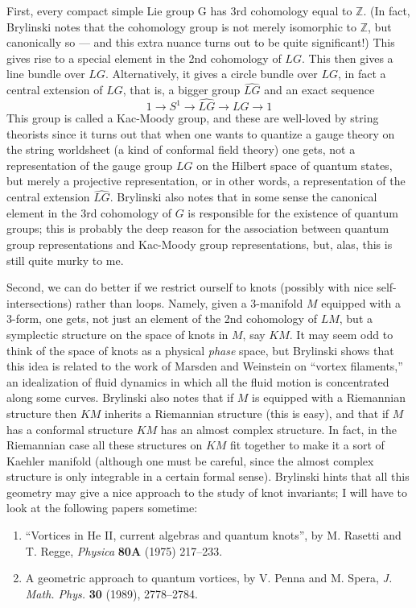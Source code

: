 \documentclass{article}
\begin{document}
First, every compact simple Lie group G has 3rd cohomology equal to
\(\mathbb{Z}\). (In fact, Brylinski notes that the cohomology group is
not merely isomorphic to \(\mathbb{Z}\), but canonically so --- and this
extra nuance turns out to be quite significant!) This gives rise to a
special element in the 2nd cohomology of \(LG\). This then gives a line
bundle over \(LG\). Alternatively, it gives a circle bundle over \(LG\),
in fact a central extension of \(LG\), that is, a bigger group
\(\widehat{LG}\) and an exact sequence
\[1 \to S^1 \to \widehat{LG} \to LG \to 1\] This group is called a
Kac-Moody group, and these are well-loved by string theorists since it
turns out that when one wants to quantize a gauge theory on the string
worldsheet (a kind of conformal field theory) one gets, not a
representation of the gauge group \(LG\) on the Hilbert space of quantum
states, but merely a projective representation, or in other words, a
representation of the central extension \(\widehat{LG}\). Brylinski also
notes that in some sense the canonical element in the 3rd cohomology of
\(G\) is responsible for the existence of quantum groups; this is
probably the deep reason for the association between quantum group
representations and Kac-Moody group representations, but, alas, this is
still quite murky to me.

Second, we can do better if we restrict ourself to knots (possibly with
nice self-intersections) rather than loops. Namely, given a 3-manifold
\(M\) equipped with a 3-form, one gets, not just an element of the 2nd
cohomology of \(LM\), but a symplectic structure on the space of knots
in \(M\), say \(KM\). It may seem odd to think of the space of knots as
a physical \emph{phase} space, but Brylinski shows that this idea is
related to the work of Marsden and Weinstein on ``vortex filaments,'' an
idealization of fluid dynamics in which all the fluid motion is
concentrated along some curves. Brylinski also notes that if \(M\) is
equipped with a Riemannian structure then \(KM\) inherits a Riemannian
structure (this is easy), and that if \(M\) has a conformal structure
\(KM\) has an almost complex structure. In fact, in the Riemannian case
all these structures on \(KM\) fit together to make it a sort of Kaehler
manifold (although one must be careful, since the almost complex
structure is only integrable in a certain formal sense). Brylinski hints
that all this geometry may give a nice approach to the study of knot
invariants; I will have to look at the following papers sometime:

\begin{enumerate}
\def\labelenumi{\arabic{enumi})}
\setcounter{enumi}{2}
\item
  ``Vortices in He II, current algebras and quantum knots'', by M.
  Rasetti and T. Regge, \emph{Physica} \textbf{80A} (1975) 217--233.
\item
  A geometric approach to quantum vortices, by V. Penna and M. Spera,
  \emph{J. Math. Phys.} \textbf{30} (1989), 2778--2784.
\end{enumerate}
\end{document}
